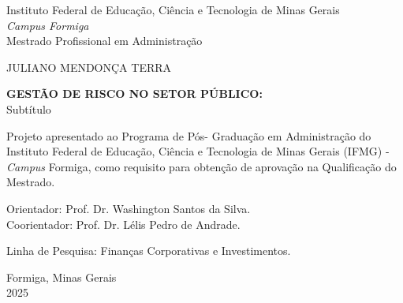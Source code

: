 
\thispagestyle{empty}

\begin{center}
    \large
    Instituto Federal de Educação, Ciência e Tecnologia de Minas Gerais \\ 
    \textit{Campus Formiga} \\
    \sc Mestrado Profissional em Administração
    
    \vspace{3cm}
    JULIANO MENDONÇA TERRA
    
    \vspace{3cm}
    \textbf{GESTÃO DE RISCO NO SETOR PÚBLICO:} \\
    Subtítulo
    
    \vspace{2cm}
    \begin{flushright}
    \begin{minipage}{0.6\textwidth}
    \small
    Projeto apresentado ao Programa de Pós-
    Graduação em Administração do Instituto
    Federal de Educação, Ciência e
    Tecnologia de Minas Gerais (IFMG) -
    \textit{Campus} Formiga, como requisito para
    obtenção de aprovação na Qualificação
    do Mestrado.
    \end{minipage}
    \end{flushright}
    
    \vspace{0.5cm}
    \begin{flushright}
    \small
    Orientador: Prof. Dr. Washington Santos da Silva.\\
    Coorientador: Prof. Dr. Lélis Pedro de Andrade.
    
    \vspace{0.5cm}
    Linha de Pesquisa: Finanças Corporativas e Investimentos.
    \end{flushright}
    
    \vfill
    Formiga, Minas Gerais \\
    2025
\end{center}


\newpage

\thispagestyle{empty}

\newenvironment{meuresumo}{
  \clearpage
  \small
  \vspace{-1cm}
  \begin{center}
    \bfseries RESUMO
    \vspace{0.5em}
  \end{center}
  \begin{quote}
}{
  \end{quote}
  \vspace{-1.1em}
  \begin{center}
  \begin{minipage}{0.87\textwidth} 
  \textbf{Palavras-chave:} palavra 1, palavra 2, palavra 3.
  \end{minipage}
  \end{center}
  \clearpage
}

